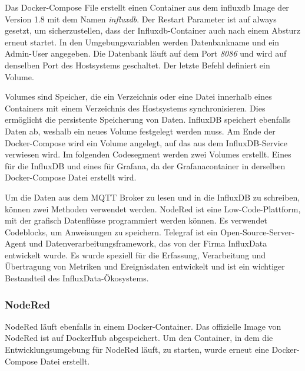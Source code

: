 \documentclass[a4paper, 12pt, oneside, toc=listofnumbered, bibliography=totoc]{scrbook}
\begin{document}
		
		
		Das Docker-Compose File erstellt einen Container aus dem influxdb Image der Version 1.8 mit dem Namen \textit{influxdb}. Der Restart Parameter ist auf always gesetzt, um sicherzustellen, dass der Influxdb-Container auch nach einem Absturz erneut startet. In den Umgebungsvariablen werden Datenbankname und ein Admin-User angegeben. Die Datenbank läuft auf dem Port \textit{8086} und wird auf denselben Port des Hostsystems geschaltet. Der letzte Befehl definiert ein Volume. 
		
		Volumes sind Speicher, die ein Verzeichnis oder eine Datei innerhalb eines Containers mit einem Verzeichnis des Hostsystems synchronisieren. Dies ermöglicht die persistente Speicherung von Daten. InfluxDB speichert ebenfalls Daten ab, weshalb ein neues Volume festgelegt werden muss. Am Ende der Docker-Compose wird ein Volume angelegt, auf das aus dem InfluxDB-Service verwiesen wird. Im folgenden Codesegment werden zwei Volumes erstellt. Eines für die InfluxDB und eines für Grafana, da der Grafanacontainer in derselben Docker-Compose Datei erstellt wird.
		
		
		
		Um die Daten aus dem MQTT Broker zu lesen und in die InfluxDB zu schreiben, können zwei Methoden verwendet werden. NodeRed ist eine Low-Code-Plattform, mit der grafisch Datenflüsse programmiert werden können. Es verwendet Codeblocks, um Anweisungen zu speichern. Telegraf ist ein Open-Source-Server-Agent und Datenverarbeitungsframework, das von der Firma InfluxData entwickelt wurde. Es wurde speziell für die Erfassung, Verarbeitung und Übertragung von Metriken und Ereignisdaten entwickelt und ist ein wichtiger Bestandteil des InfluxData-Ökosystems. 
		
			\subsubsection{NodeRed}
			
			NodeRed läuft ebenfalls in einem Docker-Container. Das offizielle Image von NodeRed ist auf DockerHub abgespeichert. Um den Container, in dem die Entwicklungsumgebung für NodeRed läuft, zu starten, wurde erneut eine Docker-Compose Datei erstellt. 
			
			
			
\end{document}
